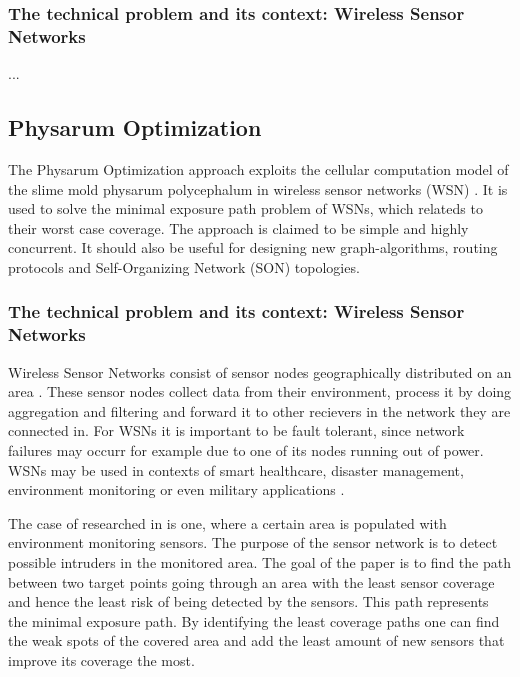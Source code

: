 \documentclass{IWORK2014}
\begin{document}
\subsubsection{The technical problem and its context: Wireless Sensor Networks}
...

\subsection{Physarum Optimization}
The Physarum Optimization approach exploits the cellular computation model of the slime mold physarum polycephalum in wireless sensor networks (WSN) \cite{liu2012physarum}. It is used to solve the minimal exposure path problem of WSNs, which relateds to their worst case coverage. The approach is claimed to be simple and highly concurrent. It should also be useful for designing new graph-algorithms, routing protocols and Self-Organizing Network (SON) topologies.

\subsubsection{The technical problem and its context: Wireless Sensor Networks}
Wireless Sensor Networks consist of sensor nodes geographically distributed on an area \cite{nazi2013robust}. These sensor nodes collect data from their environment, process it by doing aggregation and filtering and forward it to other recievers in the network they are connected in. For WSNs it is important to be fault tolerant, since network failures may occurr for example due to one of its nodes running out of power. WSNs may be used in contexts of smart healthcare, disaster management, environment monitoring \cite{nazi2013robust} or even military applications \cite{liu2012physarum}.

The case of researched in \cite{liu2012physarum} is one, where a certain area is populated with environment monitoring sensors. The purpose of the sensor network is to detect possible intruders in the monitored area. The goal of the paper is to find the path between two target points going through an area with the least sensor coverage and hence the least risk of being detected by the sensors. This path represents the minimal exposure path. By identifying the least coverage paths one can find the weak spots of the covered area and add the least amount of new sensors that improve its coverage the most.
\end{document}
